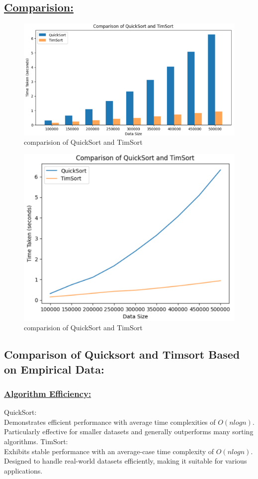 \documentclass[a4paper, 9pt, twocolumn]{article}
\begin{document}
\subsection*{\underline{Comparision:}}
\begin{figure}[h]
  \centering
  \includegraphics[width=0.8\linewidth]{comp1.png}  %
  \caption{comparision of QuickSort and TimSort}
  \label{fig:comp1}
\end{figure}
\begin{figure}[h]
  \centering
  \includegraphics[width=0.8\linewidth]{comp2.png}  %
  \caption{comparision of QuickSort and TimSort}
  \label{fig:comp2}
\end{figure}

\subsection*{Comparison of Quicksort and Timsort Based on Empirical Data:}
\subsubsection*{\underline{Algorithm Efficiency:}}
QuickSort:\\
Demonstrates efficient performance with average time complexities of $O(n log n)$.
Particularly effective for smaller datasets and generally outperforms many sorting algorithms.
TimSort:\\
Exhibits stable performance with an average-case time complexity of $O(n log n)$.
Designed to handle real-world datasets efficiently, making it suitable for various applications.
\end{document}
